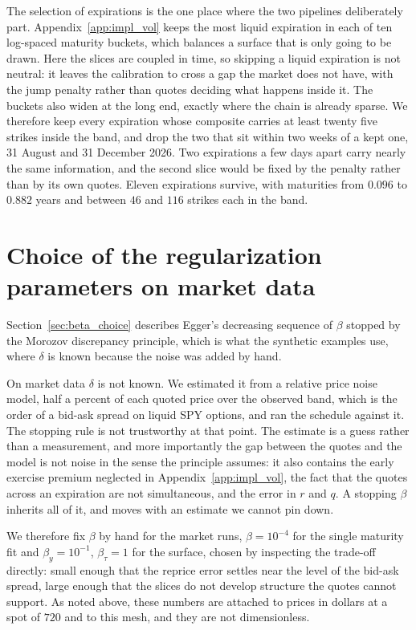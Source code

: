 The selection of expirations is the one place where the two pipelines deliberately part.
Appendix~\ref{app:impl_vol} keeps the most liquid expiration in each of ten log-spaced maturity
buckets, which balances a surface that is only going to be drawn. Here the slices are coupled
in time, so skipping a liquid expiration is not neutral: it leaves the calibration to cross a
gap the market does not have, with the jump penalty rather than quotes deciding what happens
inside it. The buckets also widen at the long end, exactly where the chain is already sparse.
We therefore keep every expiration whose composite carries at least twenty five strikes inside
the band, and drop the two that sit within two weeks of a kept one, 31 August and 31 December
2026. Two expirations a few days apart carry nearly the same information, and the second slice
would be fixed by the penalty rather than by its own quotes. Eleven expirations survive, with
maturities from $0.096$ to $0.882$ years and between $46$ and $116$ strikes each in the band.

\section{Choice of the regularization parameters on market data}
\label{subsec:beta_market}

Section~\ref{sec:beta_choice} describes Egger's decreasing sequence of $\beta$ stopped by the
Morozov discrepancy principle, which is what the synthetic examples use, where $\delta$ is
known because the noise was added by hand.

On market data $\delta$ is not known. We estimated it from a relative price noise model, half a
percent of each quoted price over the observed band, which is the order of a bid-ask spread on
liquid SPY options, and ran the schedule against it. The stopping rule is not trustworthy at
that point. The estimate is a guess rather than a measurement, and more importantly the gap
between the quotes and the model is not noise in the sense the principle assumes: it also
contains the early exercise premium neglected in Appendix~\ref{app:impl_vol}, the fact that the
quotes across an expiration are not simultaneous, and the error in $r$ and $q$. A stopping
$\beta$ inherits all of it, and moves with an estimate we cannot pin down.

We therefore fix $\beta$ by hand for the market runs, $\beta = 10^{-4}$ for the single maturity
fit and $\beta_y = 10^{-1}$, $\beta_\tau = 1$ for the surface, chosen by inspecting the
trade-off directly: small enough that the reprice error settles near the level of the bid-ask
spread, large enough that the slices do not develop structure the quotes cannot support. As
noted above, these numbers are attached to prices in dollars at a spot of $720$ and to this
mesh, and they are not dimensionless.

